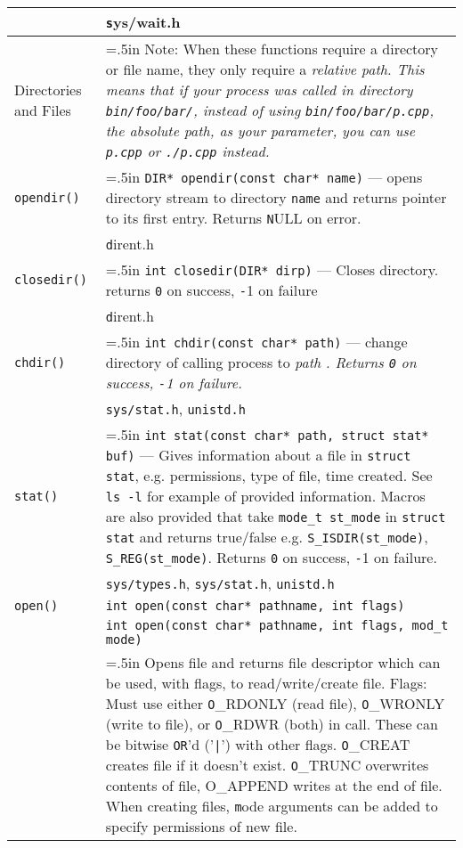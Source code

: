 \documentclass{article}
\newcommand{\indenth}[1][.5]{\hangindent=#1in
                         \hangafter=1 }
\begin{document}
\begin{longtabu}{p{1in}|p{5.7in}}
        \\
    & \texttt sys/wait.h
        \\ \hline
    Directories and Files & \indenth Note: When these functions require a directory or file name, they only require a \itshape relative path\rm. This means that if your process was called in directory \texttt{bin/foo/bar/}, instead of using \texttt{bin/foo/bar/p.cpp}, the \itshape absolute path\rm, as your parameter, you can use \texttt{p.cpp} or \texttt{./p.cpp} instead. \par
        \\
    \texttt{opendir()} & \indenth\texttt{DIR* opendir(const char* name)} --- opens directory stream to directory \texttt{name} and returns pointer to its first entry. Returns \texttt NULL on error. 
        \\
    & \texttt dirent.h
        \\ \hline
    \texttt{closedir()} & \indenth\texttt{int closedir(DIR* dirp)} --- Closes  directory. returns \texttt 0 on success, \texttt -1 on failure
        \\
    & \texttt dirent.h
        \\ \hline
    \texttt{chdir()} & \indenth\texttt{int chdir(const char* path)} --- change directory of calling process to \it path \rm . Returns \texttt 0 on success, \texttt -1 on failure.
        \\
    & \texttt{sys/stat.h}, \texttt{unistd.h}
        \\
    \texttt{stat()} & \indenth\texttt{int stat(const char* path,  struct stat* buf)} --- Gives information about a file in \texttt{struct stat}, e.g. permissions, type of file, time created. See \texttt{ls -l} for example of provided information. Macros are also provided that take \texttt{mode\_t st\_mode} in \texttt{struct stat} and returns true/false e.g. \texttt{S\_ISDIR(st\_mode)}, \texttt{S\_REG(st\_mode)}. Returns \texttt 0 on success, \texttt -1 on failure.
        \\
    & \texttt{sys/types.h}, \texttt{sys/stat.h}, \texttt{unistd.h}
        \\ \hline
    \texttt{open()} & \texttt{int open(const char* pathname, int flags)}
        \\
    & \texttt{int open(const char* pathname, int flags, mod\_t mode)}
        \\
    & \indenth Opens file and returns file descriptor which can be used, with flags, to read/write/create file. Flags: Must use either \texttt O\_RDONLY (read file), \texttt O\_WRONLY (write to file), or \texttt O\_RDWR (both) in call. These can be bitwise \texttt{OR}'d ('\texttt{|}') with other flags. \texttt O\_CREAT creates file if it doesn't exist. \texttt O\_TRUNC overwrites contents of file, O\_APPEND writes at the end of file. When creating files, \texttt mode arguments can be added to specify permissions of new file.

\end{longtabu}
\end{document}
